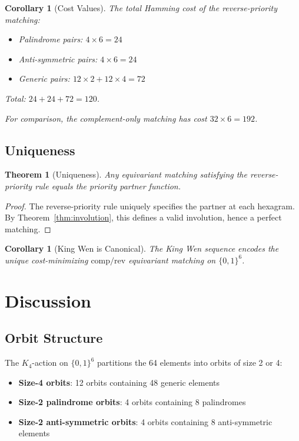 \documentclass[11pt]{article}
\theoremstyle{definition}
\theoremstyle{plain}
\newtheorem{theorem}[definition]{Theorem}
\newtheorem{corollary}[definition]{Corollary}
\newcommand{\B}{\{0,1\}}
\newcommand{\comp}{\mathrm{comp}}
\newcommand{\rev}{\mathrm{rev}}
\begin{document}
\begin{corollary}[Cost Values]
The total Hamming cost of the reverse-priority matching:
\begin{itemize}
    \item Palindrome pairs: $4 \times 6 = 24$
    \item Anti-symmetric pairs: $4 \times 6 = 24$
    \item Generic pairs: $12 \times 2 + 12 \times 4 = 72$
\end{itemize}
Total: $24 + 24 + 72 = 120$.

For comparison, the complement-only matching has cost $32 \times 6 = 192$.
\end{corollary}

\subsection{Uniqueness}

\begin{theorem}[Uniqueness]\label{thm:unique}
Any equivariant matching satisfying the reverse-priority rule equals the priority partner function.
\end{theorem}

\begin{proof}
The reverse-priority rule uniquely specifies the partner at each hexagram. By Theorem~\ref{thm:involution}, this defines a valid involution, hence a perfect matching.
\end{proof}

\begin{corollary}[King Wen is Canonical]
The King Wen sequence encodes the unique cost-minimizing $\comp/\rev$ equivariant matching on $\B^6$.
\end{corollary}

\section{Discussion}

\subsection{Orbit Structure}

The $K_4$-action on $\B^6$ partitions the 64 elements into orbits of size 2 or 4:
\begin{itemize}
    \item \textbf{Size-4 orbits}: 12 orbits containing 48 generic elements
    \item \textbf{Size-2 palindrome orbits}: 4 orbits containing 8 palindromes
    \item \textbf{Size-2 anti-symmetric orbits}: 4 orbits containing 8 anti-symmetric elements
\end{itemize}
\end{document}
